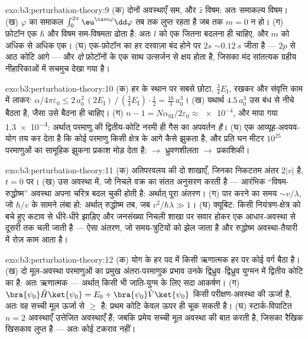 \begin{solution}{exo:b3:perturbation-theory:9}
(क) दोनों अवस्थाएँ सम, और $\hat z$ विषम: अतः समाकल्य विषम। (ख)
$\varphi$ का समाकल $\int_0^{2\pi}\eu^{\iu m\varphi}\dd\varphi$
तब तक लुप्त रहता है जब तक $m = 0$ न हो। (ग) फ़ोटॉन एक $\hbar$ और
विषम सम-विषमता ढोता है: अतः $l$ को एक जितना बदलना ही चाहिए, और $m$ को
अधिक से अधिक एक। (घ) एक-फ़ोटॉन का हर दरवाज़ा बंद होने पर
$2s$ $\sim\qty{0.12}{s}$ जीता है --- $2p$ से आठ कोटि आगे --- और
\emph{दो} फ़ोटॉनों के एक साथ उत्सर्जन से क्षय होता है, जिसका मंद
सांतत्यक ग्रहीय नीहारिकाओं में सचमुच देखा गया है।
\end{solution}

\begin{solution}{exo:b3:perturbation-theory:10}
(क) हर के स्थान पर सबसे छोटा, $\tfrac34
E_{\text{I}}$, रखकर और संवृत्ति काम में लाकर: $\alpha/4\pi\varepsilon_0 \le
2\,a_0^2\,(2E_{\text{I}})\,/\,(\tfrac34 E_{\text{I}})\cdot\tfrac12
= \tfrac{16}3\,a_0^3$। (ख) यथार्थ $4.5\,a_0^3$ उस बंध से नीचे बैठता
है, जैसा उसे बैठना ही चाहिए। (ग) $n - 1 = N\alpha_{\text{SI}}/2\varepsilon_0
\approx \num{e-4}$, और मापा गया \num{1.3e-4}: अर्थात् परमाणु की
द्वितीय-कोटि नरमी ही गैस का अपवर्तन \emph{है}। (घ) एक
आव्यूह-अवयव-योग तय कर देता है कि कोई परमाणु किसी क्षेत्र के आगे कैसे
झुकता है, और प्रति घन मीटर $10^{25}$ परमाणुओं का सामूहिक झुकना
प्रकाश मोड़ देता है:  $\to$ ध्रुवणशीलता $\to$ प्रकाशिकी।
\end{solution}

\begin{solution}{exo:b3:perturbation-theory:11}
(क) अतिपरवलय की दो शाखाएँ, जिनका निकटतम अंतर $2|v|$ है, $t = 0$ पर।
(ख) उस अवस्था में, जो निचले वक्र का संतत अनुसरण करती है --- आरंभिक
``विषम-रुद्धोष्म'' अवस्था अपना चरित्र बदल चुकी होती है: अर्थात् पूरा
अंतरण। (ग) पार करने का समय $\sim v/\lambda$, जो $\hbar/v$ के सामने
लंबा हो: अर्थात् रुद्धोष्म तब, जब $v^2/\hbar\lambda \gg 1$। (घ) क्यूबिट:
किसी नियंत्रण-क्षेत्र को बचे हुए कटाव से धीरे-धीरे झाड़िए और
जनसंख्या निचली शाखा पर सवार होकर एक आधार-अवस्था से दूसरी तक चली जाती
है --- ऐसा अंतरण, जो समय-त्रुटियों को झेल जाता है और
रुद्धोष्म अवस्था-तैयारी में रोज़ काम आता है।
\end{solution}

\begin{solution}{exo:b3:perturbation-theory:12}
(क) योग के हर पद में किसी ऋणात्मक हर पर कोई वर्ग बैठा है।
(ख) दो मूल-अवस्था परमाणुओं का प्रमुख अंतरा-परमाणुक प्रभाव उनके
द्विध्रुव--द्विध्रुव युग्मन में द्वितीय कोटि का है: अतः ऋणात्मक ---
अर्थात् किसी भी जाति-युग्म के लिए सदा आकर्षण। (ग) $\bra{\psi_0}\hat H\ket{
\psi_0} = E_0 + \bra{\psi_0}\hat V\ket{\psi_0}$ किसी
परीक्षण-अवस्था की ऊर्जा है, अतः वह सच्ची मूल ऊर्जा से $\ge$ है: प्रथम
कोटि केवल ऊपर ही चूक सकती है। (घ) स्टार्क-विपाटित $n = 2$ अवस्थाएँ
उत्तेजित अवस्थाएँ हैं; जबकि प्रमेय सच्ची मूल अवस्था की बात करती है,
जिसका रैखिक खिसकाव लुप्त है --- अतः कोई टकराव नहीं।
\end{solution}

